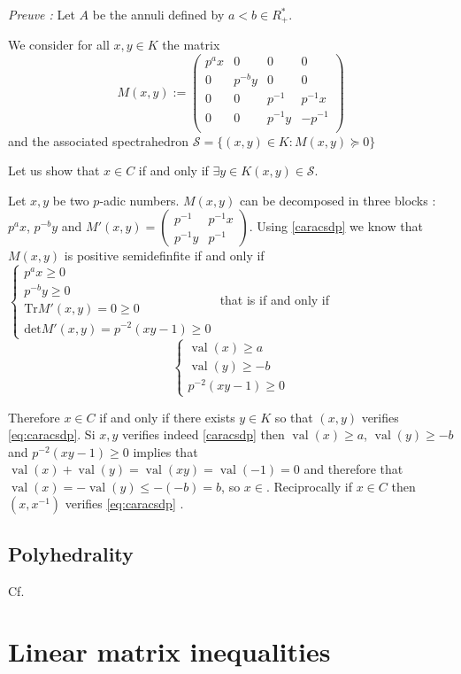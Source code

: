 \documentclass[a4paper,12pt]{article}
\DeclareMathOperator{\val}{val}
\begin{document}
\textit{Preuve :}
Let $A$ be the annuli defined by $a<b \in R^*_+$.

We consider for all $x,y \in K $ the matrix  $$M(x,y) :=
\begin{pmatrix} 
	p^ax & 0 & 0 & 0 \\
	0 & p^{-b}y & 0 & 0 \\
	0 & 0 & p^{-1} & p^{-1}x \\
	0 & 0 & p^{-1}y & - p^{-1}  \\
\end{pmatrix} $$ and the associated spectrahedron $\mathcal{S}= \{(x,y) \in K  : M(x,y) \succeq 0\} $

Let us show that $x \in C$ if and only if  $\exists y \in K \left( x,y \right) \in \mathcal{S}$.

Let $x,y$ be two $p$-adic numbers.
$M(x,y)$ can be decomposed in three blocks : $p^ax$, $p^{-b}y $ and $M'(x,y) = \begin{pmatrix} p^{-1} & p^{-1}x \\ p^{-1} y & p^{-1}\end{pmatrix} $. Using \ref{caracsdp} we know that $M(x,y)$ is positive semidefinfite if and only if
$
\begin{cases}
	p^ax \ge 0 \\
	p^{-b}y \ge 0\\
	\text{Tr}M'\left( x,y \right) = 0 \ge 0\\
	\text{det} M'(x,y ) = p^{-2}\left( xy-1 \right)  \ge 0 
\end{cases}
$ 
that is if and only if 
\begin{equation}
	\label{eq:caracsdp} 
	\begin{cases} 
		\val\left(x\right)\ge a\\
		\val\left(y\right)\ge -b\\
		p^{-2} \left( xy-1 \right) \ge 0
	\end{cases}
\end{equation}




Therefore $x \in C$ if and only if there exists $y \in K $ so that $(x, y)$ verifies \ref{eq:caracsdp}. Si $x, y$ verifies indeed \ref{caracsdp} then $\val\left(x\right)\ge a$, $\val\left(y\right)\ge -b$ and $p^{-2} \left( xy-1 \right) \ge 0$ implies that $\val\left(x\right)+\val\left(y\right)=\val\left(xy\right) = \val\left(-1\right) =0$ and therefore that $\val\left(x\right)=-\val\left(y\right)\le -(-b)  =b$, so $x \in $. Reciprocally if $x \in C$ then $(x,x^{-1}) $ verifies \ref{eq:caracsdp}  .


\subsection{Polyhedrality}
Cf. \cite{bhardwaj2015deciding}

\section{Linear matrix inequalities}


\printbibliography
\end{document}
